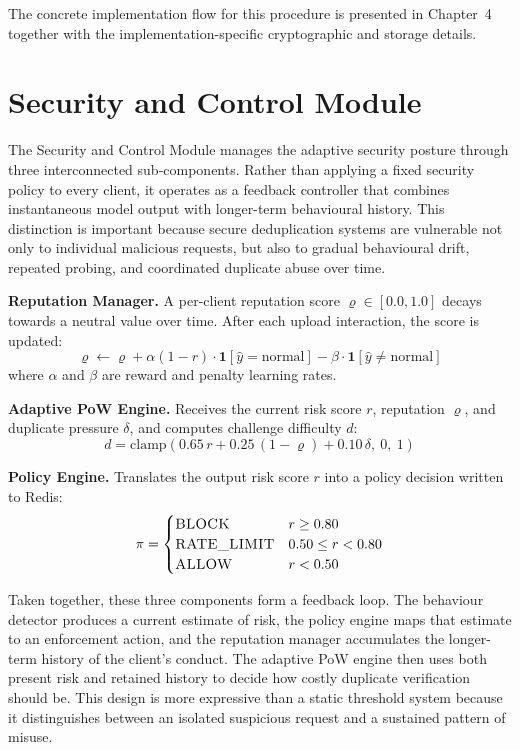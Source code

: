 \documentclass[12pt,a4paper,oneside]{report}
\begin{document}
The concrete implementation flow for this procedure is presented in Chapter~4 together with the implementation-specific cryptographic and storage details.

\section{Security and Control Module}

The Security and Control Module manages the adaptive security posture through three interconnected sub-components.
Rather than applying a fixed security policy to every client, it operates as a feedback controller that combines instantaneous model output with longer-term behavioural history.
This distinction is important because secure deduplication systems are vulnerable not only to individual malicious requests, but also to gradual behavioural drift, repeated probing, and coordinated duplicate abuse over time.

\textbf{Reputation Manager.}
A per-client reputation score $\varrho \in [0.0, 1.0]$ decays towards a neutral value over time.
After each upload interaction, the score is updated:
\begin{equation}
  \varrho \gets \varrho + \alpha(1-r) \cdot \mathbf{1}[\hat{y} = \text{normal}] - \beta \cdot \mathbf{1}[\hat{y} \neq \text{normal}]
  \label{eq:reputation}
\end{equation}
where $\alpha$ and $\beta$ are reward and penalty learning rates.

\textbf{Adaptive PoW Engine.}
Receives the current risk score $r$, reputation $\varrho$, and duplicate pressure $\delta$, and computes challenge difficulty $d$:
\begin{equation}
  d = \mathrm{clamp}\!\left(0.65\,r + 0.25\,(1-\varrho) + 0.10\,\delta,\ 0,\ 1\right)
  \label{eq:diff}
\end{equation}

\textbf{Policy Engine.}
Translates the output risk score $r$ into a policy decision written to Redis:
\begin{equation}
  \pi =
  \begin{cases}
    \textsc{BLOCK}      & r \geq 0.80 \\
    \textsc{RATE\_LIMIT} & 0.50 \leq r < 0.80 \\
    \textsc{ALLOW}      & r < 0.50
  \end{cases}
  \label{eq:policy}
\end{equation}

Taken together, these three components form a feedback loop.
The behaviour detector produces a current estimate of risk, the policy engine maps that estimate to an enforcement action, and the reputation manager accumulates the longer-term history of the client's conduct.
The adaptive PoW engine then uses both present risk and retained history to decide how costly duplicate verification should be.
This design is more expressive than a static threshold system because it distinguishes between an isolated suspicious request and a sustained pattern of misuse.
\end{document}
